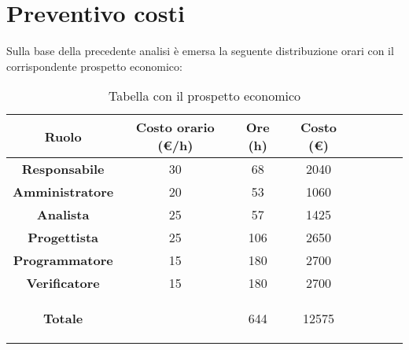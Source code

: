 \section{Preventivo costi}

Sulla base della precedente analisi è emersa la seguente distribuzione orari con il corrispondente prospetto economico:

\begin{table}[H]
    \centering
    \renewcommand{\arraystretch}{1.5}
    \begin{tabular}{|>{\bfseries}c|c|c|c|c|c|c|>{\bfseries}c|}
        \hline
        \rowcolor{gray!70} 
        \color{white}\textbf{Ruolo} & \color{white}\textbf{Costo orario (\euro/h)} & \color{white}\textbf{Ore (h)} & \color{white}\textbf{Costo (\euro)} \\
        \hline
        \color{black}\textbf{Responsabile} & 30 & 68 & 2040  \\ 
        \hline
        \rowcolor{gray!10} %
        \color{black}\textbf{Amministratore} & 20 & 53 & 1060 \\ 
        \hline
        \color{black}\textbf{Analista} & 25 & 57 & 1425  \\ 
        \hline
        \rowcolor{gray!10} %
        \color{black}\textbf{Progettista} & 25 & 106 & 2650  \\ 
        \hline
         \color{black}\textbf{Programmatore} & 15 & 180 & 2700 \\ 
        \hline
        \rowcolor{gray!10} %
        \color{black}\textbf{Verificatore} & 15 & 180 & 2700 \\ 
        \hline

        \rowcolor{gray!70} 
        \color{white}\textbf{Totale} & \color{white} & \color{white}644 & \color{white}12575  \\ 
        \hline
    \end{tabular}
    \caption{Tabella con il prospetto economico}
\end{table}